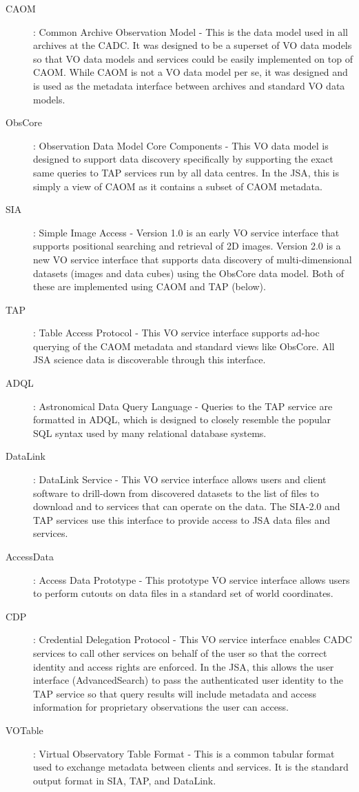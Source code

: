 \documentclass[final,authoryear,5p,times,twocolumn]{elsarticle}
\begin{document}
\begin{description}
\item[CAOM] : Common Archive Observation Model - This is the data model
used in all archives at the CADC. It was designed to be a superset
of VO data models so that VO data models and services could be easily
implemented on top of CAOM. While CAOM is not a VO data model per se,
it was designed and is used as the metadata interface between archives
and standard VO data models. \citep{2007ASPC..376..347D,2013ASPC..475..159R}
\item[ObsCore] : Observation Data Model Core Components - This VO data model
is designed to support data discovery specifically by supporting the
exact same queries to TAP services run by all data centres. In the JSA,
this is simply a view of CAOM as it contains a subset of CAOM metadata. \citep{obscore}
\item[SIA] : Simple Image Access - Version 1.0 is an early VO service
interface that supports positional searching and retrieval of 2D images.
Version 2.0 is a new VO service interface that supports data discovery
of multi-dimensional datasets (images and data cubes) using the ObsCore
data model. Both of these are implemented using CAOM and TAP (below). \citep{tap}
\item[TAP] : Table Access Protocol - This VO service interface supports ad-hoc
querying of the CAOM metadata and standard views like ObsCore. All JSA
science data is discoverable through this interface. \citep{tap}
\item[ADQL] : Astronomical Data Query Language - Queries to the TAP service
are formatted in ADQL, which is designed to closely resemble the popular SQL
syntax used by many relational database systems. \citep{adql}
\item[DataLink] : DataLink Service - This VO service interface allows users
and client software to drill-down from discovered datasets to the list
of files to download and to services that can operate on the data. The
SIA-2.0 and TAP services use this interface to provide access to JSA
data files and services. \citep{datalink}
\item[AccessData] : Access Data Prototype - This prototype VO service interface
allows users to perform cutouts on data files in a standard set of
world coordinates.
\item[CDP] : Credential Delegation Protocol - This VO service interface enables
CADC services to call other services on behalf of the user so that the
correct identity and access rights are enforced. In the JSA, this allows
the user interface (AdvancedSearch) to pass the authenticated user
identity to the TAP service so that query results will include metadata
and access information for proprietary observations the user can access. \citep{cdp}
\item[VOTable] : Virtual Observatory Table Format - This is a common tabular
format used to exchange metadata between clients and services. It is
the standard output format in SIA, TAP, and DataLink. \citep{votable}
\end{description}
\end{document}
